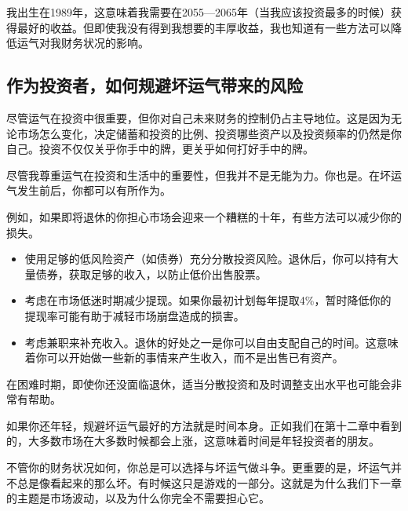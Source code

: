 我出生在1989年，这意味着我需要在2055—2065年（当我应该投资最多的时候）获得最好的收益。但即使我没有得到我想要的丰厚收益，我也知道有一些方法可以降低运气对我财务状况的影响。

\subsection{作为投资者，如何规避坏运气带来的风险}

尽管运气在投资中很重要，但你对自己未来财务的控制仍占主导地位。这是因为无论市场怎么变化，决定储蓄和投资的比例、投资哪些资产以及投资频率的仍然是你自己。投资不仅仅关乎你手中的牌，更关乎如何打好手中的牌。

尽管我尊重运气在投资和生活中的重要性，但我并不是无能为力。你也是。在坏运气发生前后，你都可以有所作为。

例如，如果即将退休的你担心市场会迎来一个糟糕的十年，有些方法可以减少你的损失。

\begin{itemize}
\item 使用足够的低风险资产（如债券）充分分散投资风险。退休后，你可以持有大量债券，获取足够的收入，以防止低价出售股票。
\item 考虑在市场低迷时期减少提现。如果你最初计划每年提取4\%，暂时降低你的提现率可能有助于减轻市场崩盘造成的损害。
\item 考虑兼职来补充收入。退休的好处之一是你可以自由支配自己的时间。这意味着你可以开始做一些新的事情来产生收入，而不是出售已有资产。
\end{itemize}

在困难时期，即使你还没面临退休，适当分散投资和及时调整支出水平也可能会非常有帮助。

如果你还年轻，规避坏运气最好的方法就是时间本身。正如我们在第十二章中看到的，大多数市场在大多数时候都会上涨，这意味着时间是年轻投资者的朋友。

不管你的财务状况如何，你总是可以选择与坏运气做斗争。更重要的是，坏运气并不总是像看起来的那么坏。有时候这只是游戏的一部分。这就是为什么我们下一章的主题是市场波动，以及为什么你完全不需要担心它。

